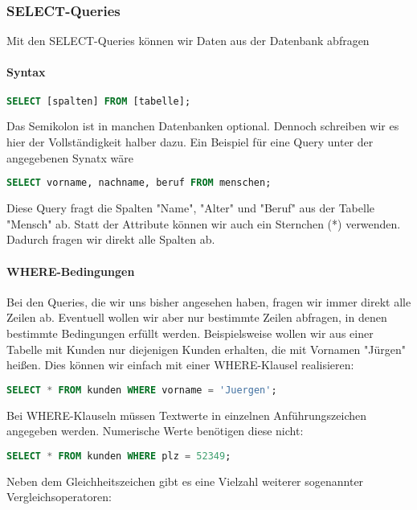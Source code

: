 \documentclass{article}
\begin{document}
	\subsubsection{SELECT-Queries}
	Mit den SELECT-Queries können wir Daten aus der Datenbank abfragen
	
	\paragraph{Syntax}
	\begin{lstlisting}[language=SQL]
	SELECT [spalten] FROM [tabelle]; 
	\end{lstlisting}
	Das Semikolon ist in manchen Datenbanken optional. Dennoch schreiben wir es hier der Vollständigkeit halber dazu. Ein Beispiel für eine Query unter der angegebenen Synatx wäre

	\begin{lstlisting}[language=SQL]
	SELECT vorname, nachname, beruf FROM menschen;
	\end{lstlisting}

	Diese Query fragt die Spalten "Name", "Alter" und "Beruf" aus der Tabelle "Mensch" ab.
	Statt der Attribute können wir auch ein Sternchen (*) verwenden. Dadurch fragen wir direkt alle Spalten ab.

	\paragraph{WHERE-Bedingungen}
	Bei den Queries, die wir uns bisher angesehen haben, fragen wir immer direkt alle Zeilen ab. Eventuell wollen wir aber nur bestimmte Zeilen abfragen, in denen bestimmte Bedingungen erfüllt werden. Beispielsweise wollen wir aus einer Tabelle mit Kunden nur diejenigen Kunden erhalten, die mit Vornamen "Jürgen" heißen. Dies können wir einfach mit einer WHERE-Klausel realisieren:

	\begin{lstlisting}[language=SQL]
	SELECT * FROM kunden WHERE vorname = 'Juergen';
	\end{lstlisting}

	Bei WHERE-Klauseln müssen Textwerte in einzelnen Anführungszeichen angegeben werden. Numerische Werte benötigen diese nicht:

	\begin{lstlisting}[language=SQL]
	SELECT * FROM kunden WHERE plz = 52349;
	\end{lstlisting}

	Neben dem Gleichheitszeichen gibt es eine Vielzahl weiterer sogenannter Vergleichsoperatoren:
\end{document}
